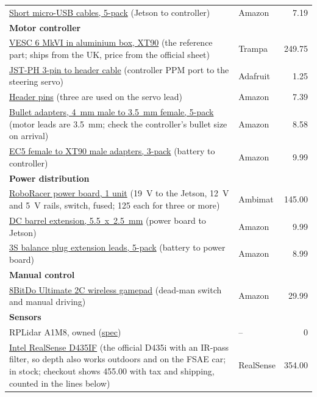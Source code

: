 \documentclass[11pt,a4paper]{article}
\begin{document}
\begin{longtable}{p{11.6cm}lr}
\href{https://www.amazon.com/dp/B095JZSHXQ}{Short micro-USB cables, 5-pack} (Jetson to controller) & Amazon & 7.19 \\
\multicolumn{3}{l}{\textbf{Motor controller}} \\
\href{https://trampaboards.com/vesc-6-mkv-in-cnc-t6-silicone-sealed-aluminium-box-with-genuine-xt90-connectors--vedder-electronic-speed-controller-trampa-special-p-27536.html}{VESC 6 MkVI in aluminium box, XT90} (the reference part; ships from the UK, price from the official sheet) & Trampa & 249.75 \\
\href{https://www.adafruit.com/product/3893}{JST-PH 3-pin to header cable} (controller PPM port to the steering servo) & Adafruit & 1.25 \\
\href{https://www.amazon.com/dp/B076F64ZCJ}{Header pins} (three are used on the servo lead) & Amazon & 7.39 \\
\href{https://www.amazon.com/dp/B07Z4FRQNX}{Bullet adapters, 4~mm male to 3.5~mm female, 5-pack} (motor leads are 3.5~mm; check the controller's bullet size on arrival) & Amazon & 8.58 \\
\href{https://www.amazon.com/dp/B07MG5SXKC}{EC5 female to XT90 male adapters, 3-pack} (battery to controller) & Amazon & 9.99 \\
\multicolumn{3}{l}{\textbf{Power distribution}} \\
\href{https://orders.ambimat.com/product/roboracer-power-board-1-qty-non-rohs-compliant/}{RoboRacer power board, 1 unit} (19~V to the Jetson, 12~V and 5~V rails, switch, fused; 125 each for three or more) & Ambimat & 145.00 \\
\href{https://www.amazon.com/dp/B0BZ3YT59F}{DC barrel extension, 5.5~x~2.5~mm} (power board to Jetson) & Amazon & 9.99 \\
\href{https://www.amazon.com/dp/B07PX37XX5}{3S balance plug extension leads, 5-pack} (battery to power board) & Amazon & 8.99 \\
\multicolumn{3}{l}{\textbf{Manual control}} \\
\href{https://www.amazon.com/dp/B0FX3TJ5RX}{8BitDo Ultimate 2C wireless gamepad} (dead-man switch and manual driving) & Amazon & 29.99 \\
\multicolumn{3}{l}{\textbf{Sensors}} \\
RPLidar A1M8, owned (\href{https://www.slamtec.com/en/Lidar/A1}{spec}) & -- & 0 \\
\href{https://store.realsenseai.com/buy-intel-realsense-depth-camera-d435if.html}{Intel RealSense D435IF} (the official D435i with an IR-pass filter, so depth also works outdoors and on the FSAE car; in stock; checkout shows 455.00 with tax and shipping, counted in the lines below) & RealSense & 354.00 \\

\end{longtable}
\end{document}

